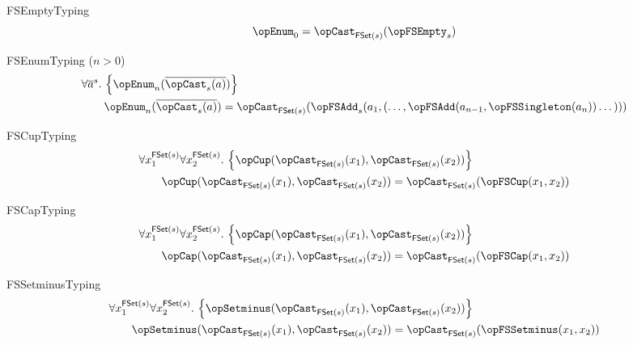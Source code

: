 \documentclass[11pt, a4paper, oneside]{article}
\begin{document}
\begin{axioms}
\item[FSEmptyTyping] \[
        \opEnum_0 = \opCast_{\FSet(s)}(\opFSEmpty_s)
    \]

\item[FSEnumTyping ($n > 0$)] \[
        \begin{aligned}
            &\forall \overline{a}^s.\, \st{ \opEnum_n(\overline{\opCast_s(a)}) } \\
            &\qquad \opEnum_n(\overline{\opCast_s(a)}) = \opCast_{\FSet(s)}(\opFSAdd_s(a_1, (\dots, \opFSAdd(a_{n-1}, \opFSSingleton(a_n)) \dots)))
        \end{aligned}
    \]

\item[FSCupTyping] \[
        \begin{aligned}
            &\forall x_1^{\FSet(s)} \forall x_2^{\FSet(s)}.\, \st{ \opCup(\opCast_{\FSet(s)}(x_1), \opCast_{\FSet(s)}(x_2)) } \\
            &\qquad \opCup(\opCast_{\FSet(s)}(x_1), \opCast_{\FSet(s)}(x_2)) = \opCast_{\FSet(s)}(\opFSCup(x_1, x_2))
        \end{aligned}
    \]

\item[FSCapTyping] \[
        \begin{aligned}
            &\forall x_1^{\FSet(s)} \forall x_2^{\FSet(s)}.\, \st{ \opCap(\opCast_{\FSet(s)}(x_1), \opCast_{\FSet(s)}(x_2)) } \\
            &\qquad \opCap(\opCast_{\FSet(s)}(x_1), \opCast_{\FSet(s)}(x_2)) = \opCast_{\FSet(s)}(\opFSCap(x_1, x_2))
        \end{aligned}
    \]

\item[FSSetminusTyping] \[
        \begin{aligned}
            &\forall x_1^{\FSet(s)} \forall x_2^{\FSet(s)}.\, \st{ \opSetminus(\opCast_{\FSet(s)}(x_1), \opCast_{\FSet(s)}(x_2)) } \\
            &\qquad \opSetminus(\opCast_{\FSet(s)}(x_1), \opCast_{\FSet(s)}(x_2)) = \opCast_{\FSet(s)}(\opFSSetminus(x_1, x_2))
        \end{aligned}
    \]


\end{axioms}
\end{document}
